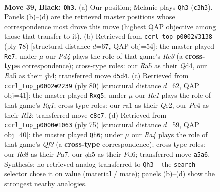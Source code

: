 \documentclass[11pt]{article}
\begin{document}
\clearpage

\begin{figure}[p]\centering
\begin{subfigure}{0.46\textwidth}\centering
\resizebox{\linewidth}{!}{%
\newchessgame
\chessboard[
  setfen={2r3k1/3n2p1/1p6/r2p3Q/P3p2N/2q5/2P2P1n/R2R2K1 b - - 1 39},
  showmover=false,
  pgfstyle=straightmove, color=movearrow, markmove={c3-h3}
]}
\caption{}
\end{subfigure}\hfill
\begin{subfigure}{0.46\textwidth}\centering
\resizebox{\linewidth}{!}{%
\newchessgame
\chessboard[
  setfen={3r1rk1/p5p1/1p6/1P1p1Bn1/P2Q2Pq/4R3/6KP/5R2 w - - 1 40},
  showmover=false,
  pgfstyle=straightmove, color=movearrow, markmove={e3-e7}
]}
\caption{}
\end{subfigure}
\\[4pt]
\begin{subfigure}{0.46\textwidth}\centering
\resizebox{\linewidth}{!}{%
\newchessgame
\chessboard[
  setfen={4qrk1/2b3p1/4P3/3p1Pp1/p2p3P/2rN4/4QR2/6RK w - - 0 41},
  showmover=false,
  pgfstyle=straightmove, color=movearrow, markmove={g1-g5}
]}
\caption{}
\end{subfigure}\hfill
\begin{subfigure}{0.46\textwidth}\centering
\resizebox{\linewidth}{!}{%
\newchessgame
\chessboard[
  setfen={6k1/p1p1r1p1/2PpPq2/7P/4Q3/6R1/P4r1P/6RK b - - 7 38},
  showmover=false,
  pgfstyle=straightmove, color=movearrow, markmove={f6-h6}
]}
\caption{}
\end{subfigure}
\caption{\textbf{Move 39, Black: \texttt{Qh3}.} (a) Our position; Melanie plays \texttt{Qh3} (\texttt{c3h3}). Panels (b)--(d) are the retrieved master positions whose correspondence most drove this move (highest QAP objective among those that transfer to it). (b) Retrieved from \texttt{ccrl\_top\_p0002\#3138} (ply 78) [structural distance $d$=67, QAP obj=54]: the master played \texttt{Re7}; under $\mu$ our \emph{Pd4} plays the role of that game's \emph{Re3} (a \textbf{cross-type} correspondence); cross-type roles: our \emph{R}a5 as their \emph{Q}d4, our \emph{R}a5 as their \emph{q}h4; transferred move \texttt{d5d4}. (c) Retrieved from \texttt{ccrl\_top\_p0002\#2239} (ply 80) [structural distance $d$=62, QAP obj=41]: the master played \texttt{Rxg5}; under $\mu$ our \emph{Rc1} plays the role of that game's \emph{Rg1}; cross-type roles: our \emph{r}a1 as their \emph{Q}e2, our \emph{P}e4 as their \emph{R}f2; transferred move \texttt{c8c7}. (d) Retrieved from \texttt{ccrl\_top\_p0000\#1063} (ply 75) [structural distance $d$=59, QAP obj=40]: the master played \texttt{Qh6}; under $\mu$ our \emph{Ra4} plays the role of that game's \emph{Qf3} (a \textbf{cross-type} correspondence); cross-type roles: our \emph{R}c8 as their \emph{P}a7, our \emph{q}h5 as their \emph{P}d6; transferred move \texttt{a5a6}. Synthesis: no retrieved analog transferred to \texttt{Qh3} -- the \texttt{search} selector chose it on value (material / mate); panels (b)--(d) show the strongest nearby analogies.}
\label{fig:thought-m77}
\end{figure}
\end{document}
